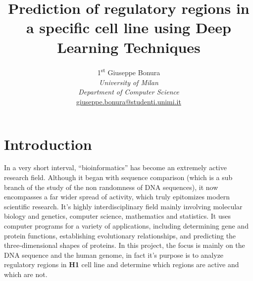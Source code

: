 \documentclass{article}
\begin{document}
\title{Prediction of regulatory regions in a specific cell line using Deep Learning Techniques}
\author{{1\textsuperscript{st} Giuseppe Bonura}\\
\textit{University of Milan}\\
\textit{Department of Computer Science}\\
\url{giuseppe.bonura@studenti.unimi.it}}

\maketitle

\section{Introduction}
\label{sec:introduction}
In a very short interval, “bioinformatics” has become an extremely active research field. Although it began with sequence comparison (which is a sub branch of the study of the non randomness of DNA sequences), it now encompasses a far wider spread of activity, which truly epitomizes modern scientific research. It's highly interdisciplinary field mainly involving molecular biology and genetics, computer science, mathematics and statistics. It uses computer programs for a variety of applications, including determining gene and protein functions, establishing evolutionary relationships, and predicting the three-dimensional shapes of proteins.
\newline
\noindent
In this project, the focus is mainly on the DNA sequence and the human genome, in fact it's purpose is to analyze regulatory regions in \textbf{H1} cell line and determine which regions are active and which are not.
\end{document}
